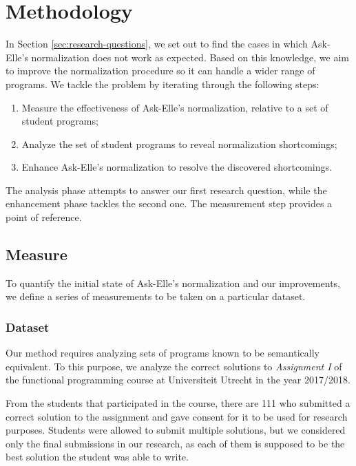 \chapter{Methodology}
\label{sec:methodology}

In Section \ref{sec:research-questions}, we set out to find the cases in which Ask-Elle's normalization does not work as expected. Based on this knowledge, we aim to improve the normalization procedure so it can handle a wider range of programs. We tackle the problem by iterating through the following steps:

\begin{enumerate}
    \item Measure the effectiveness of Ask-Elle's normalization, relative to a set of student programs;
    \item Analyze the set of student programs to reveal normalization shortcomings;
    \item Enhance Ask-Elle's normalization to resolve the discovered shortcomings.
\end{enumerate}

The analysis phase attempts to answer our first research question, while the enhancement phase tackles the second one. The measurement step provides a point of reference.

\section{Measure}
\label{sec:method-measure}

To quantify the initial state of Ask-Elle's normalization and our improvements, we define a series of measurements to be taken on a particular dataset.

\subsection{Dataset}

Our method requires analyzing sets of programs known to be semantically equivalent. To this purpose, we analyze the correct solutions to \emph{Assignment I} of the functional programming course at Universiteit Utrecht in the year 2017/2018.

From the students that participated in the course, there are 111 who submitted a correct solution to the assignment and gave consent for it to be used for research purposes. Students were allowed to submit multiple solutions, but we considered only the final submissions in our research, as each of them is supposed to be the best solution the student was able to write.

